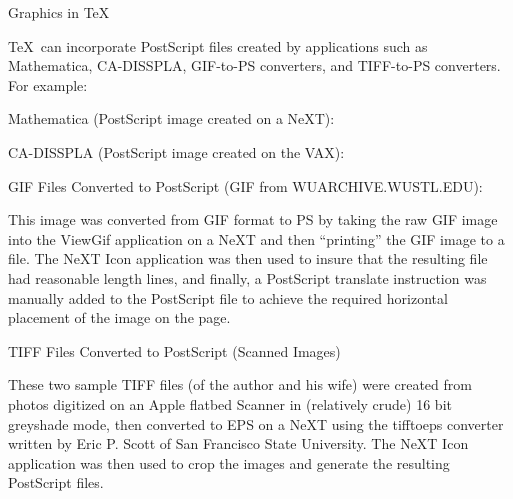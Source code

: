 \nopagenumbers


\twelvepoint
\rm
\noindent
\centerline{\twlbf Graphics in \TeX}
\bigskip\bigskip\par\noindent
\TeX\ can incorporate PostScript files created by applications
such as Mathematica, CA-DISSPLA, GIF-to-PS converters, and 
TIFF-to-PS converters. For example:
\bigskip\par\noindent
{\twlbf Mathematica (PostScript image created on a NeXT):}
\bigskip\par\noindent
\epsfxsize=5in
\bigskip\bigskip\par\noindent
{\twlbf CA-DISSPLA (PostScript image created on the VAX):}
\bigskip\par\noindent
{}
\vfill\eject
\par\noindent
{\twlbf GIF Files Converted to PostScript (GIF from WUARCHIVE.WUSTL.EDU):}
\bigskip\par\noindent
This image was converted from GIF format to PS by taking the raw GIF image
into the ViewGif application on a NeXT and then ``printing'' the GIF image 
to a file. The NeXT Icon application was then used to insure that 
the resulting file had reasonable length lines, and finally, a PostScript 
translate instruction was manually added to the PostScript file to achieve 
the required horizontal placement of the image on the page.
\bigskip\bigskip\bigskip\par\noindent
{}
\bigskip\bigskip\bigskip\par\noindent
{\twlbf TIFF Files Converted to PostScript (Scanned Images)}
\bigskip\par\noindent
These two sample TIFF files (of the author and his wife) were created 
from photos digitized on an Apple flatbed Scanner in (relatively crude) 
16 bit greyshade mode, then converted to EPS on a NeXT using the 
tifftoeps converter written by Eric P. Scott of San Francisco State 
University. The NeXT Icon application was then used to crop the images 
and generate the resulting PostScript files.
\vglue 2.8in
\vfill\eject
